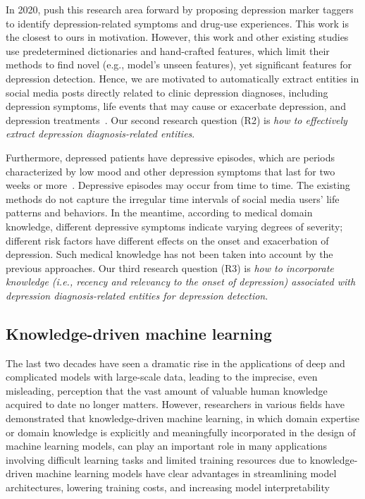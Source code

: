 In 2020, \cite{hussain_exploring_2020} push this research area forward by proposing depression marker taggers to identify depression-related symptoms and drug-use experiences. This work is the closest to ours in motivation. However, this work and other existing studies use predetermined dictionaries and hand-crafted features, which limit their methods to find novel (e.g., model's unseen features), yet significant features for depression detection. Hence, we are motivated to automatically extract entities in social media posts directly related to clinic depression diagnoses, including depression symptoms, life events that may cause or exacerbate depression, and depression treatments~\citep{beck_depression_2014}. Our second research question (R2) is \textit{how to effectively extract depression diagnosis-related entities}.

Furthermore, depressed patients have depressive episodes, which are periods characterized by low mood and other depression symptoms that last for two weeks or more~\citep{beck_depression_2014}. Depressive episodes may occur from time to time. The existing methods do not capture the irregular time intervals of social media users' life patterns and behaviors. In the meantime, according to medical domain knowledge, different depressive symptoms indicate varying degrees of severity; different risk factors have different effects on the onset and exacerbation of depression. Such medical knowledge has not been taken into account by the previous approaches. Our third research question (R3) is \textit{how to incorporate knowledge (i.e., recency and relevancy to the onset of depression) associated with depression diagnosis-related entities for depression detection}.

\subsection{Knowledge-driven machine learning}\label{sec:related:three}

The last two decades have seen a dramatic rise in the applications of deep and complicated models with large-scale data, leading to the imprecise, even misleading, perception that the vast amount of valuable human knowledge acquired to date no longer matters. However, researchers in various fields have demonstrated that knowledge-driven machine learning, in which domain expertise or domain knowledge is explicitly and meaningfully incorporated in the design of machine learning models, can play an important role in many applications involving difficult learning tasks and limited training resources due to knowledge-driven machine learning models have clear advantages in streamlining model architectures, lowering training costs, and increasing model interpretability~\citep{hussain_exploring_2020}~


